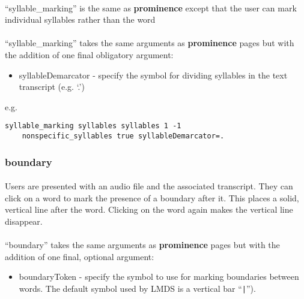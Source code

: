 \paragraph{}
``syllable\_marking'' is the same as \textbf{prominence} except that the user can mark individual syllables rather than the word

\paragraph{}
``syllable\_marking'' takes the same arguments as \textbf{prominence} pages but with the addition of one final obligatory argument:

\begin{itemize}
\item syllableDemarcator - specify the symbol for dividing syllables in the text transcript (e.g. `.')
\end{itemize}

e.g.
\begin{lstlisting}
syllable_marking syllables syllables 1 -1 
	nonspecific_syllables true syllableDemarcator=.
\end{lstlisting}


\subsubsection{boundary}

\paragraph{}
Users are presented with an audio file and the associated transcript.  They can click on a word to mark the presence of a boundary after it.  This places a solid, vertical line after the word.  Clicking on the word again makes the vertical line disappear.

\paragraph{}
``boundary'' takes the same arguments as \textbf{prominence} pages but with the addition of one final, optional argument:

\begin{itemize}
\item boundaryToken - specify the symbol to use for marking boundaries between words.  The default symbol used by LMDS is a vertical bar ``\texttt{|}'').
\end{itemize}

